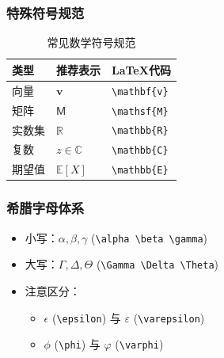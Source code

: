 \subsubsection{特殊符号规范}
\begin{table}[h]
    \centering
    \caption{常见数学符号规范}
    \begin{tabular}{lll}
        \toprule
        类型 & 推荐表示 & LaTeX代码 \\
        \midrule
        向量 & $\mathbf{v}$ & \verb|\mathbf{v}| \\
        矩阵 & $\mathsf{M}$ & \verb|\mathsf{M}| \\
        实数集 & $\mathbb{R}$ & \verb|\mathbb{R}| \\
        复数 & $z \in \mathbb{C}$ & \verb|\mathbb{C}| \\
        期望值 & $\mathbb{E}[X]$ & \verb|\mathbb{E}| \\
        \bottomrule
    \end{tabular}
\end{table}

\subsubsection{希腊字母体系}
\begin{itemize}
    \item 小写：$\alpha, \beta, \gamma$ (\verb|\alpha \beta \gamma|)
    \item 大写：$\Gamma, \Delta, \Theta$ (\verb|\Gamma \Delta \Theta|)
    \item 注意区分：
    \begin{itemize}
        \item $\epsilon$ (\verb|\epsilon|) 与 $\varepsilon$ (\verb|\varepsilon|)
        \item $\phi$ (\verb|\phi|) 与 $\varphi$ (\verb|\varphi|)
    \end{itemize}
\end{itemize}

